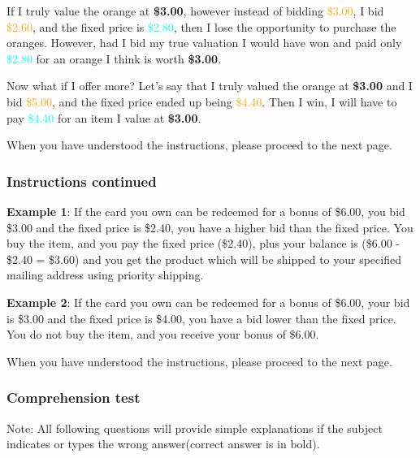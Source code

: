 \documentclass[12pt]{article}
\begin{document}
If I truly value the orange at \textbf{\$3.00}, however instead of bidding \textcolor{orange}{\$3.00}, I bid \textcolor{orange}{\$2.60}, and the fixed price is \textcolor{cyan}{\$2.80}, then I lose the opportunity to purchase the oranges. However, had I bid my true valuation I would have won and paid only \textcolor{cyan}{\$2.80} for an orange I think is worth \textbf{\$3.00}.  

Now what if I offer more? Let’s say that I truly valued the orange at \textbf{\$3.00} and I bid \textcolor{orange}{\$5.00}, and the fixed price ended up being \textcolor{orange}{\$4.40}. Then I win, I will have to pay \textcolor{cyan}{\$4.40} for an item I value at \textbf{\$3.00}.  

\vspace{0.5cm} 

When you have understood the instructions, please proceed to the next page.  


\clearpage


\subsubsection*{Instructions continued}


\textbf{Example 1}: If the card you own can be redeemed for a bonus of \$6.00, you bid \$3.00 and the fixed price is \$2.40, you have a higher bid than the fixed price. You buy the item, and you pay the fixed price (\$2.40), plus your balance is (\$6.00 - \$2.40 = \$3.60) and you get the product which will be shipped to your specified mailing address using priority shipping.
\vspace{0.5cm}


\textbf{Example 2}: If the card you own can be redeemed for a bonus of \$6.00, your bid is \$3.00 and the fixed price is \$4.00, you have a bid lower than the fixed price. You do not buy the item, and you receive your bonus of \$6.00.

\vspace{0.5cm}

When you have understood the instructions, please proceed to the next page.
\clearpage


\subsubsection*{Comprehension test}
Note: All following questions will provide simple explanations if the subject indicates or types the wrong answer(correct answer is in bold).
\end{document}
